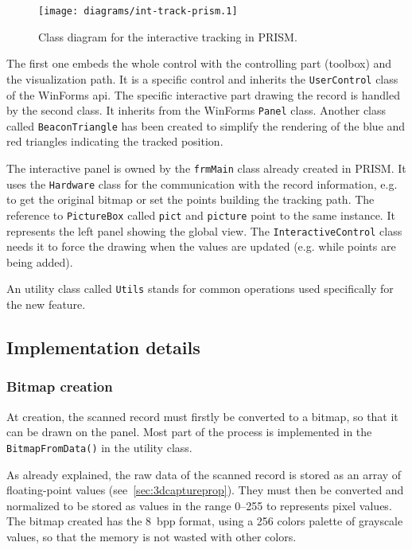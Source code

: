\begin{figure}[!ht]
\centering
\texttt{[image: diagrams/int-track-prism.1]}
\caption{Class diagram for the interactive tracking in PRISM.}
\label{fig:inttrackprismdiag}
\end{figure}

The first one embeds the whole control with the controlling part (toolbox) and the visualization path. It is a specific control and inherits the \texttt{UserControl} class of the WinForms \gls{api}. The specific interactive part drawing the record is handled by the second class. It inherits from the WinForms \texttt{Panel} class. Another class called \texttt{BeaconTriangle} has been created to simplify the rendering of the blue and red triangles indicating the tracked position.

The interactive panel is owned by the \texttt{frmMain} class already created in PRISM. It uses the \texttt{Hardware} class for the communication with the record information, e.g. to get the original bitmap or set the points building the tracking path. The reference to \texttt{PictureBox} called \texttt{pict} and \texttt{picture} point to the same instance. It represents the left panel showing the global view. The \texttt{InteractiveControl} class needs it to force the drawing when the values are updated (e.g. while points are being added).

An utility class called \texttt{Utils} stands for common operations used specifically for the new feature.

\subsection{Implementation details}
\label{sec:intimpldet}

\subsubsection{Bitmap creation}

At creation, the scanned record must firstly be converted to a bitmap, so that it can be drawn on the panel. Most part of the process is implemented in the \texttt{BitmapFromData()} in the utility class.

As already explained, the raw data of the scanned record is stored as an array of floating-point values (see~\autoref{sec:3dcaptureprop}). They must then be converted and normalized to be stored as values in the range \numrange[range-phrase=--]{0}{255} to represents pixel values. The bitmap created has the \SI{8}{bpp} format, using a 256 colors palette of grayscale values, so that the memory is not wasted with other colors.

